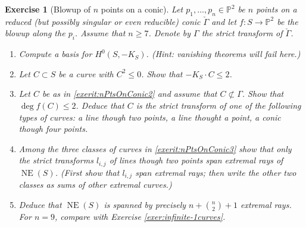 \documentclass[a4paper,11pt]{amsart}
\newtheorem{exercise}[theorem]{Exercise}
\def\deg{\operatorname{deg}}
\def\NE{\operatorname{NE}}
\newcommand{\PP}{\mathbb{P}}
\begin{document}
\begin{exercise}[{Blowup of $n$ points on a conic}]
	Let $p_1, \dots, p_n \in \PP^2$ be $n$ points on a reduced (but possibly singular or even reducible) conic $\check{\Gamma}$ and let $f\colon S \to \PP^2$ be the blowup along the $p_i$.
	Assume that $n\geq 7$.
	Denote by $\Gamma$ the strict transform of $\check{\Gamma}$.
	\begin{enumerate}
		\item Compute a basis for $H^0(S,-K_S)$. {\small (Hint: vanishing theorems will fail here.)}
		\item\label{exerit:nPtsOnConic2} Let $C\subset S$ be a curve with $C^2\leq 0$.
		Show that $-K_S \cdot C \leq 2$.
		\item\label{exerit:nPtsOnConic3} Let $C$ be as in \eqref{exerit:nPtsOnConic2} and assume that $C \not\subset \Gamma$.
		Show that $\deg f(C) \leq 2$.
		Deduce that $C$ is the strict transform of one of the following types of curves: a line though two points, a line thought a point, a conic though four points.
		\item Among the three classes of curves in \eqref{exerit:nPtsOnConic3} show that only the strict transforms $l_{i,j}$ of lines though two points span extremal rays of $\NE(S)$.
		{\small (First show that $l_{i,j}$ span extremal rays; then write the other two classes as sums of other extremal curves.)}
		\item Deduce that $\NE(S)$ is spanned by precisely $n + \binom{n}{2} + 1$ extremal rays.
		For $n=9$, compare with Exercise \ref{exer:infinite-1curves}.
	\end{enumerate}	 
\end{exercise}
\end{document}
